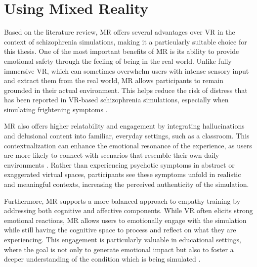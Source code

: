 \section{Using Mixed Reality}

Based on the literature review, MR offers several advantages over VR in the context of schizophrenia simulations, making it a particularly suitable choice for this thesis. One of the most important benefits of MR is its ability to provide emotional safety through the feeling of being in the real world. Unlike fully immersive VR, which can sometimes overwhelm users with intense sensory input and extract them from the real world, MR allows participants to remain grounded in their actual environment. This helps reduce the risk of distress that has been reported in VR-based schizophrenia simulations, especially when simulating frightening symptoms \cite{Zare-Bidaki2022}.

\vspace{1em}

MR also offers higher relatability and engagement by integrating hallucinations and delusional content into familiar, everyday settings, such as a classroom. This contextualization can enhance the emotional resonance of the experience, as users are more likely to connect with scenarios that resemble their own daily environments \cite{Krogmeier2024}. Rather than experiencing psychotic symptoms in abstract or exaggerated virtual spaces, participants see these symptoms unfold in realistic and meaningful contexts, increasing the perceived authenticity of the simulation.

\vspace{1em}

Furthermore, MR supports a more balanced approach to empathy training by addressing both cognitive and affective components. While VR often elicits strong emotional reactions, MR allows users to emotionally engage with the simulation while still having the cognitive space to process and reflect on what they are experiencing. This engagement is particularly valuable in educational settings, where the goal is not only to generate emotional impact but also to foster a deeper understanding of the condition which is being simulated \cite{Martingano2021, Rueda2020}.

\vspace{1em}

